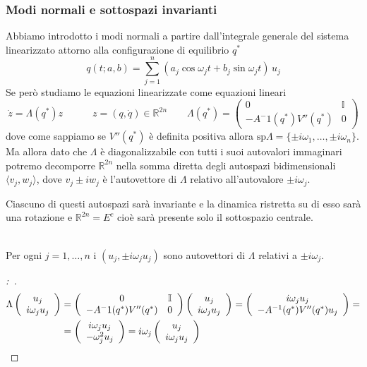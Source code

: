 \documentclass[11pt,a4paper,twoside]{book}
\newenvironment{lemma}[1][\empty]{\begin{Lemma}{
\ifx\empty#1\relax\else\mdseries\itshape#1\\\fi
}{}}{\end{Lemma}}
\newenvironment{dimo}[1][\proofname]{
	\begin{tcolorbox}[
	breakable, 
	enhanced, 
	interior hidden, 
	frame hidden, 
	borderline west = {1pt}{0pt}{gray}, 
	top=0pt, bottom=0pt, left=0pt]
\begin{proof}[#1:~]
}
{
\end{proof}
\end{tcolorbox}
}
\theoremstyle{esss}
\theoremstyle{dotless}
\numberwithin{equation}{section} %
\begin{document}
\subsubsection{Modi normali e sottospazi invarianti}

Abbiamo introdotto i modi normali a partire dall'integrale generale del sistema linearizzato attorno alla configurazione di equilibrio $q^*$
\[
q(t;a,b)=\sum_{j=1}^n \left(a_j\cos{\omega_j t} +b_j\sin{\omega_j t} \right)\,u_j
\]
Se però studiamo le equazioni linearizzate come equazioni lineari
\[
\dot{z}=\Lambda(q^*)z \quad\qquad z=(q,\dot{q} )\in\mathbb{R}^{2n} \qquad \Lambda(q^*)=\left(\begin{array}{cc}
0 & \mathbb{I} \\ -A^-1(q^*)V''(q^*) & 0
\end{array}\right)
\]
dove come sappiamo se $V''(q^*)$ è definita positiva allora $\text{sp}\Lambda=\{\pm i\omega_1,\dots,\pm i\omega_n\}$.
Ma allora dato che $\Lambda$ è diagonalizzabile con tutti i suoi autovalori immaginari potremo decomporre $\mathbb{R}^{2n}$ nella somma diretta degli autospazi bidimensionali $\langle v_j,w_j \rangle$, dove $v_j\pm iw_j$ è l'autovettore di $\Lambda$ relativo all'autovalore $\pm i\omega_j$.

Ciascuno di questi autospazi sarà invariante e la dinamica ristretta su di esso sarà una rotazione e $\mathbb{R}^{2n}=E^c$ cioè sarà presente solo il sottospazio centrale.

\begin{lemma}
Per ogni $j=1,\dots ,n$ i $(u_j,\pm i\omega_j u_j)$ sono autovettori di $\Lambda$ relativi a $\pm i\omega_j$.
\end{lemma}
\begin{dimo}
\begin{align*}
\Lambda \left(\begin{array}{c}
u_j \\ i\omega_j u_j 
\end{array}\right) &=
\left(\begin{array}{cc} 0 & \mathbb{I} \\ -A^-1(q^*)V''(q^*) & 0 \end{array}\right) \left(\begin{array}{c}
u_j \\ i\omega_j u_j \end{array}\right) = \left( \begin{array}{c}
i\omega_j u_j \\ -A^{-1}(q^*)V''(q^*) u_j
\end{array} \right) = \\
&= \left( \begin{array}{c}
i\omega_j u_j \\ -\omega_j^2 u_j
\end{array}\right) =i\omega_j \left(\begin{array}{c}
u_j \\ i\omega_j u_j
\end{array} \right) \qedhere
\end{align*}
\end{dimo}
\end{document}
